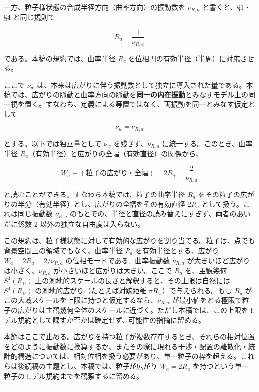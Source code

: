 \documentclass[
]{ltjsarticle}
\begin{document}
一方、粒子様状態の合成半径方向（曲率方向）の振動数を \(\nu_{R,a}\)
と書くと、§1・§4 と同じ規則で

\[R_a=\frac{1}{\nu_{R,a}}\]

である。本稿の規約では、曲率半径 \(R_a\)
を位相円の有効半径（半周）に対応させる。

ここで \(\nu_w\)
は、本来は広がりに伴う振動数として独立に導入された量である。本稿では、広がりの脈動と曲率方向の脈動を\textbf{同一の内在振動}とみなすモデル上の同一視を置く。すなわち、定義による等置ではなく、両振動を同一とみなす仮定として

\[\boxed{\ \nu_w=\nu_{R,a}\ }\]

とする。以下では独立量として \(\nu_w\) を残さず、\(\nu_{R,a}\)
に統一する。このとき、曲率半径
\(R_a\)（有効半径）と広がりの全幅（有効直径）の関係から、

\[\boxed{\ W_a\equiv(\text{粒子の広がり・全幅})=2R_a=\frac{2}{\nu_{R,a}}\ }\]

と読むことができる。すなわち本稿では、粒子の曲率半径 \(R_a\)
をその粒子の広がりの半分（有効半径）とし、広がりの全幅をその有効直径
\(2R_a\) として扱う。これは同じ振動数 \(\nu_{R,a}\)
のもとでの、半径と直径の読み替えにすぎず、両者のあいだに係数 2
以外の独立な自由度は入らない。

この規約は、粒子様状態に対して有効的な広がりを割り当てる。粒子は、点でも背景空間上の領域でもなく、曲率半径
\(R_a\) を有効半径とする、広がり \(W_a=2R_a=2/\nu_{R,a}\)
の位相モードである。曲率振動数 \(\nu_{R,a}\)
が大きいほど広がりは小さく、\(\nu_{R,a}\)
が小さいほど広がりは大きい。ここで \(R_a\) を、主観幾何
\(S^4(R_{\mathrm U})\)
上の測地的スケールの長さと解釈すると、その上限は自然には
\(S^4(R_{\mathrm U})\) の測地的広がり（たとえば対蹠距離
\(\pi R_{\mathrm U}\)）で与えられる。もし \(R_a\)
がこの大域スケールを上限に持つと仮定するなら、\(\nu_{R,a}\)
が最小値をとる極限で粒子の広がりは主観幾何全体のスケールに近づく。ただし本稿では、この上限をモデル規約として課すか否かは確定せず、可能性の指摘に留める。

本節はここで止める。広がりを持つ粒子が複数存在するとき、それらの相対位置をどのように振動数に換算するか、またその際に現れる干渉・配置の離散化・統計的構造については、相対位相を扱う必要があり、単一粒子の枠を超える。これらは後続稿の主題とし、本稿では、粒子が広がり
\(W_a=2R_a\) を持つという単一粒子のモデル規約までを観察するに留める。

\begin{center}\rule{0.5\linewidth}{0.5pt}\end{center}
\end{document}
